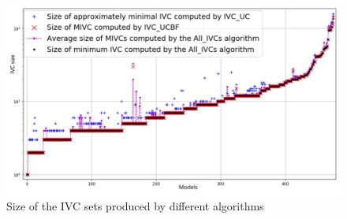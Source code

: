 \begin{figure}
  \centering
  \includegraphics[width=\columnwidth]{figs/min.jpg}
  \vspace{-0.25in}
  \caption{Size of the IVC sets produced by different algorithms}
  \vspace{-0.1in}
 \label{fig:size}
\end{figure}




